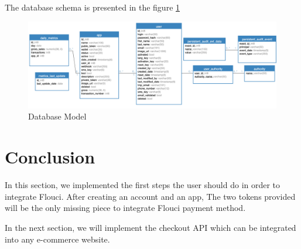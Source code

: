 \begin{spacing}{1.2}
The database schema is presented in the figure \ref{fig:database}
\begin{figure}[H]\centering
\includegraphics[width=\textwidth,keepaspectratio]{db.png}
\caption{Database Model}
\label{fig:database}
\end{figure}



\section*{Conclusion}
In this section, we implemented the first steps the user should do in order to integrate Flouci. After creating an account and an app, The two tokens provided will be the only missing piece to integrate Flouci payment method.

In the next section, we will implement the checkout API which can be integrated into any e-commerce website.
\end{spacing}
